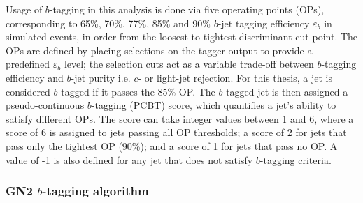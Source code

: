 \documentclass[../thesis.tex]{subfiles}
\begin{document}
Usage of $b$-tagging in this analysis is done via five operating points (\acs{OP}s), corresponding to 65\%, 70\%, 77\%, 85\% and 90\% $b$-jet tagging efficiency $\varepsilon_b$ in simulated \ttbar events, in order from the loosest to tightest discriminant cut point.
The \acs{OP}s are defined by placing selections on the tagger output to provide a predefined $\varepsilon_b$ level; the selection cuts act as a variable trade-off between $b$-tagging efficiency and $b$-jet purity i.e. $c$- or light-jet rejection. For this thesis, a jet is considered $b$-tagged if it passes the $85\%$ \acs{OP}. The $b$-tagged jet is then assigned a pseudo-continuous $b$-tagging (\acs{PCBT}) score, which quantifies a jet's ability to satisfy different \acs{OP}s. The score can take integer values between 1 and 6, where a score of 6 is assigned to jets passing all \acs{OP} thresholds; a score of 2 for jets that pass only the tightest OP (90\%); and a score of 1 for jets that pass no \acs{OP}. A value of -1 is also defined for any jet that does not satisfy $b$-tagging criteria. 

\subsubsection*{GN2 $b$-tagging algorithm}
\label{sec:gn2}
\end{document}
